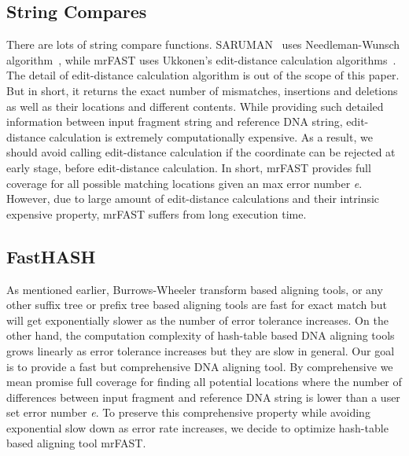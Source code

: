 \subsection{String Compares} \label{string_compre}

There are lots of string compare functions. SARUMAN~\cite{saruman} uses Needleman-Wunsch
algorithm~\cite{needleman}, while mrFAST uses Ukkonen’s edit-distance calculation algorithms~\cite{ukkonen}.
The detail of edit-distance calculation algorithm is out of the scope of this
paper. But in short, it returns the exact number of mismatches, insertions and
deletions as well as their locations and different contents. While providing
such detailed information between input fragment string and reference DNA
string, edit-distance calculation is extremely computationally expensive. As a
result, we should avoid calling edit-distance calculation if the coordinate can
be rejected at early stage, before edit-distance calculation. In short, mrFAST
provides full coverage for all possible matching locations given an max error
number \textit{e}. However, due to large amount of edit-distance calculations
and their intrinsic expensive property, mrFAST suffers from long execution
time.\\

\subsection{FastHASH} \label{fast_hash}

As mentioned earlier, Burrows-Wheeler transform based aligning tools, or any
other suffix tree or prefix tree based aligning tools are fast for exact match
but will get exponentially slower as the number of error tolerance increases.
On the other hand, the computation complexity of hash-table based DNA aligning
tools grows linearly as error tolerance increases but they are slow in general.
Our goal is to provide a fast but comprehensive DNA aligning tool. By
comprehensive we mean promise full coverage for finding all potential locations
where the number of differences between input fragment and reference DNA string
is lower than a user set error number \textit{e}. To preserve this
comprehensive property while avoiding exponential slow down as error rate
increases, we decide to optimize hash-table based aligning tool mrFAST.\\


